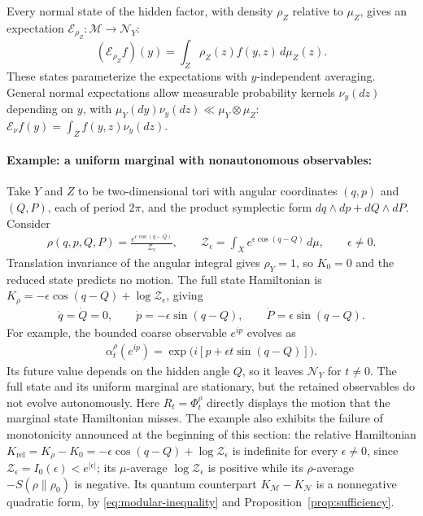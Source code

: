 \documentclass[a4paper,11pt]{article}
\theoremstyle{definition}
\newcommand{\mN}{\mathcal{N}}
\newcommand{\mM}{\mathcal{M}}
\newcommand{\mE}{\mathcal{E}}
\begin{document}
Every normal state of the hidden factor, with density $\rho_Z$ relative to $\mu_Z$,
gives an expectation $\mE_{\rho_Z}:\mM\to\mN_Y$:
\begin{equation}
 (\mE_{\rho_Z}f)(y)=\int_Z\rho_Z(z)f(y,z)\,d\mu_Z(z).
\end{equation}
These states parameterize the expectations with $y$-independent averaging.
General normal expectations allow measurable probability kernels $\nu_y(dz)$
depending on $y$, with $\mu_Y(dy)\nu_y(dz)\ll\mu_Y\otimes\mu_Z$:
$\mE_\nu f(y)=\int_Z f(y,z)\nu_y(dz)$.

\paragraph{Example: a uniform marginal with nonautonomous observables:}
Take $Y$ and $Z$ to be two-dimensional tori with angular coordinates $(q,p)$ and $(Q,P)$, each of period $2\pi$, and the product symplectic form $dq\wedge dp+dQ\wedge dP$. Consider
\begin{align}
    \rho(q,p,Q,P)=\frac{e^{\epsilon\cos(q-Q)}}{\mathcal Z_\epsilon},
    \qquad
    \mathcal Z_\epsilon=\int_X e^{\epsilon\cos(q-Q)}\,d\mu,
    \qquad \epsilon\ne0.
\end{align}
Translation invariance of the angular integral gives $\rho_Y=1$, so $K_0=0$ and the reduced state predicts no motion. The full state Hamiltonian is $K_\rho=-\epsilon\cos(q-Q)+\log\mathcal Z_\epsilon$, giving
\begin{align}
    \dot q=\dot Q=0,\qquad
    \dot p=-\epsilon\sin(q-Q),\qquad
    \dot P=\epsilon\sin(q-Q).
\end{align}
For example, the bounded coarse observable $e^{ip}$ evolves as
\begin{align}
    \alpha_t^\rho(e^{ip})
    =\exp\bigl(i[p+\epsilon t\sin(q-Q)]\bigr).
\end{align}
Its future value depends on the hidden angle $Q$, so it leaves $\mN_Y$ for $t\ne0$. The full state and its uniform marginal are stationary, but the retained observables do not evolve autonomously. Here $R_t=\Phi_t^\rho$ directly displays the motion that the marginal state Hamiltonian misses. The example also exhibits the failure of monotonicity announced at the beginning of this section: the relative Hamiltonian $K_{\mathrm{rel}}=K_\rho-K_0=-\epsilon\cos(q-Q)+\log\mathcal Z_\epsilon$ is indefinite for every $\epsilon\ne0$, since $\mathcal Z_\epsilon=I_0(\epsilon)<e^{|\epsilon|}$; its $\mu$-average $\log\mathcal Z_\epsilon$ is positive while its $\rho$-average $-S(\rho\|\rho_0)$ is negative. Its quantum counterpart $K_{\mM}-K_{\mN}$ is a nonnegative quadratic form, by \eqref{eq:modular-inequality} and Proposition~\ref{prop:sufficiency}.
\end{document}
